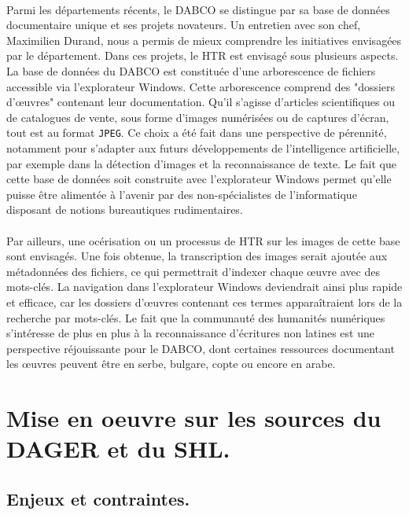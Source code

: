 \documentclass[a4paper,12pt,twoside]{book}
\begin{document}
\paragraph{}
Parmi les départements récents, le DABCO se distingue par sa base de données documentaire unique et ses projets novateurs. Un entretien avec son chef, Maximilien Durand, nous a permis de mieux comprendre les initiatives envisagées par le département. Dans ces projets, le HTR est envisagé sous plusieurs aspects.
La base de données du DABCO est constituée d’une arborescence de fichiers accessible via l’explorateur Windows. Cette arborescence comprend des "dossiers d'œuvres" contenant leur documentation. Qu'il s'agisse d'articles scientifiques ou de catalogues de vente, sous forme d'images numérisées ou de captures d'écran, tout est au format \texttt{JPEG}. Ce choix a été fait dans une perspective de pérennité, notamment pour s’adapter aux futurs développements de l'intelligence artificielle, par exemple dans la détection d'images et la reconnaissance de texte. Le fait que cette base de données soit construite avec l’explorateur Windows permet qu'elle puisse être alimentée à l'avenir par des non-spécialistes de l’informatique disposant de notions bureautiques rudimentaires.

\paragraph{}
Par ailleurs, une océrisation ou un processus de HTR sur les images de cette base sont envisagés. Une fois obtenue, la transcription des images serait ajoutée aux métadonnées des fichiers, ce qui permettrait d’indexer chaque œuvre avec des mots-clés. La navigation dans l’explorateur Windows deviendrait ainsi plus rapide et efficace, car les dossiers d'œuvres contenant ces termes apparaîtraient lors de la recherche par mots-clés. Le fait que la communauté des humanités numériques s’intéresse de plus en plus à la reconnaissance d’écritures non latines est une perspective réjouissante pour le DABCO, dont certaines ressources documentant les œuvres peuvent être en serbe, bulgare, copte ou encore en arabe.

\section{Mise en oeuvre sur les sources du DAGER et du SHL.}

	\subsection{Enjeux et contraintes.}
\end{document}
